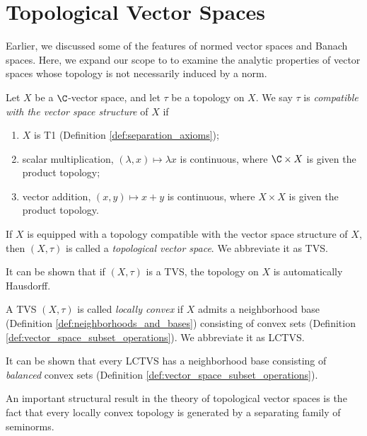 \section{Topological Vector Spaces}%
Earlier, we discussed some of the features of normed vector spaces and Banach spaces. Here, we expand our scope to to examine the analytic properties of vector spaces whose topology is not necessarily induced by a norm. 
\begin{definition}\label{def:tvs}
  Let $X$ be a $\C$-vector space, and let $\tau$ be a topology on $X$. We say $\tau$ is \textit{compatible with the vector space structure} of $X$ if
  \begin{enumerate}[(1)]
    \item $X$ is T1 (Definition \ref{def:separation_axioms});
    \item scalar multiplication, $(\lambda,x)\mapsto \lambda x$ is continuous, where $\C\times X$ is given the product topology;
    \item vector addition, $(x,y) \mapsto x + y$ is continuous, where $X\times X$ is given the product topology.
  \end{enumerate}
  If $X$ is equipped with a topology compatible with the vector space structure of $X$, then $(X,\tau)$ is called a \textit{topological vector space}. We abbreviate it as TVS.
\end{definition}
\begin{remark}
  It can be shown that if $(X,\tau)$ is a TVS, the topology on $X$ is automatically Hausdorff.
\end{remark}
\begin{definition}\label{def:lctvs}
  A TVS $\left(X,\tau\right)$ is called \textit{locally convex} if $X$ admits a neighborhood base (Definition \ref{def:neighborhoods_and_bases}) consisting of convex sets (Definition \ref{def:vector_space_subset_operations}). We abbreviate it as LCTVS.
\end{definition}
\begin{remark}
It can be shown that every LCTVS has a neighborhood base consisting of \textsl{balanced} convex sets (Definition \ref{def:vector_space_subset_operations}).
\end{remark}
An important structural result in the theory of topological vector spaces is the fact that every locally convex topology is generated by a separating family of seminorms.
